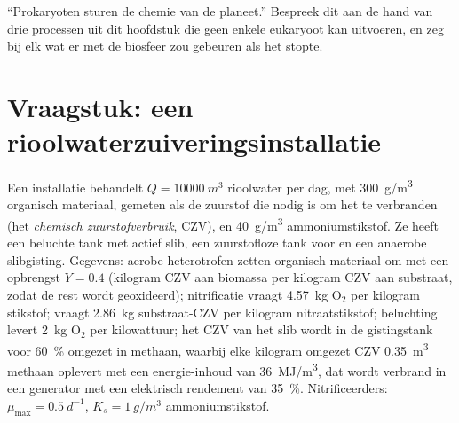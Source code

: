 \begin{exercise}[$\star\star\star$]\label{exo:b2:microbial-metabolism:12}
``Prokaryoten sturen de chemie van de planeet.'' Bespreek dit aan de hand
van drie processen uit dit hoofdstuk die geen enkele eukaryoot kan
uitvoeren, en zeg bij elk wat er met de biosfeer zou gebeuren als het
stopte.
\end{exercise}

\section{Vraagstuk: een rioolwaterzuiveringsinstallatie}

\begin{problem}
\label{pb:b2:microbial-metabolism:1}
Een installatie behandelt $Q = \qty{10000}{m^3}$ rioolwater per dag, met
\qty{300}{g/m^3} organisch materiaal, gemeten als de zuurstof die nodig
is om het te verbranden (het \emph{chemisch zuurstofverbruik}, CZV), en
\qty{40}{g/m^3} ammoniumstikstof. Ze heeft een beluchte tank met actief
slib, een zuurstofloze tank voor  en een anaerobe
slibgisting. Gegevens: aerobe heterotrofen zetten organisch materiaal om
met een opbrengst $Y = 0.4$ (kilogram CZV aan biomassa per kilogram CZV
aan substraat, zodat de rest wordt geoxideerd); nitrificatie vraagt
\qty{4.57}{kg} $\mathrm{O_2}$ per kilogram stikstof; 
vraagt \qty{2.86}{kg} substraat-CZV per kilogram nitraatstikstof;
beluchting levert \qty{2}{kg} $\mathrm{O_2}$ per kilowattuur; het CZV
van het slib wordt in de gistingstank voor \qty{60}{\%} omgezet in
methaan, waarbij elke kilogram omgezet CZV \qty{0.35}{m^3} methaan
oplevert met een energie-inhoud van \qty{36}{MJ/m^3}, dat wordt verbrand
in een generator met een elektrisch rendement van \qty{35}{\%}.
Nitrificeerders: $\mu_{\max} = \qty{0.5}{d^{-1}}$, $K_s =
\qty{1}{g/m^3}$ ammoniumstikstof.


\end{problem}
